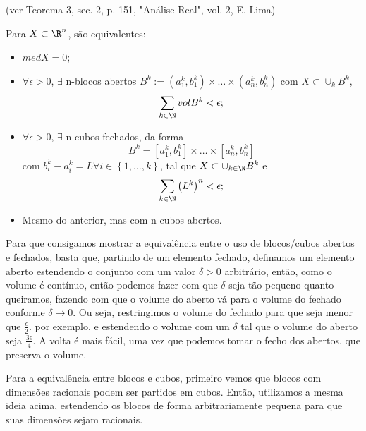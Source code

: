 \begin{prop}
    (ver Teorema 3, sec. 2, p. 151, "Análise Real", vol. 2, E. Lima)

    Para $X\subset \R^{n}$, são equivalentes:
    \begin{itemize}
        \item $med X = 0$;
	\item $\forall \epsilon>0$, $\exists $ n-blocos abertos $B^{k} := \left( a^{k}_1,b_1^{k} \right)\times \ldots\times \left( a^{k}_n,b_n^{k} \right) $ com $X\subset \cup _k B^{k}$, \[
	\sum_{k\in \N} vol B^{k} < \epsilon
	;\] 
	\item $\forall \epsilon>0$, $\exists $ n-cubos fechados, da forma \[
	B^{k}= \left[ a_1^{k},b_1^{k} \right] \times \ldots\times \left[ a_n^{k},b_n^{k} \right]
	\] com $b_i^{k} - a_i^{k}=L \forall i \in \left\{ 1,\ldots,k \right\} $, tal que $X\subset \cup _{k\in \N}B^{k}$ e \[
	\sum_{k\in \N} \left( L^{k} \right) ^{n} < \epsilon
	;\] 
	\item Mesmo do anterior, mas com n-cubos abertos.
    \end{itemize}

    \begin{observe}
	Para que consigamos mostrar a equivalência entre o uso de blocos/cubos abertos e fechados, basta que, partindo de um elemento fechado, definamos um elemento aberto estendendo o conjunto com um valor $\delta > 0$ arbitrário, então, como o volume é contínuo, então podemos fazer com que $\delta$ seja tão pequeno quanto queiramos, fazendo com que o volume do aberto vá para o volume do fechado conforme $\delta\to 0$. Ou seja, restringimos o volume do fechado para que seja menor que $\frac{\epsilon}{2}$. por exemplo, e estendendo o volume com um $\delta$ tal que o volume do aberto seja $\frac{3\epsilon}{4}$. A volta é mais fácil, uma vez que podemos tomar o fecho dos abertos, que preserva o volume.

	Para a equivalência entre blocos e cubos, primeiro vemos que blocos com dimensões racionais podem ser partidos em cubos. Então, utilizamos a mesma ideia acima, estendendo os blocos de forma arbitrariamente pequena para que suas dimensões sejam racionais.
    \end{observe}
\end{prop}

